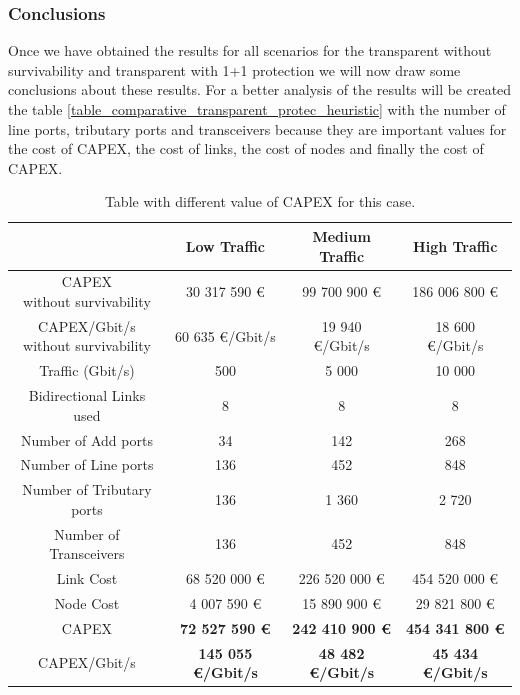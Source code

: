 \vspace{13pt}
\subsubsection{Conclusions}

Once we have obtained the results for all scenarios for the transparent without survivability and transparent with 1+1 protection we will now draw some conclusions about these results. For a better analysis of the results will be created the table \ref{table_comparative_transparent_protec_heuristic} with the number of line ports, tributary ports and transceivers because they are important values for the cost of CAPEX, the cost of links, the cost of nodes and finally the cost of CAPEX.\\

\begin{table}[H]
\centering
\begin{tabular}{| c | c | c | c |}
 \hline
 & Low Traffic & Medium Traffic & High Traffic \\
 \hline\hline
 \makecell{CAPEX \\ without survivability} & 30 317 590 \euro & 99 700 900 \euro & 186 006 800 \euro \\ \hline
 \makecell{CAPEX/Gbit/s \\ without survivability} & 60 635 \euro/Gbit/s & 19 940 \euro/Gbit/s & 18 600 \euro/Gbit/s \\ \hline
 Traffic (Gbit/s) & 500 & 5 000 & 10 000 \\ \hline
 Bidirectional Links used & 8 & 8 & 8 \\ \hline
 Number of Add ports & 34 & 142 & 268 \\ \hline
 Number of Line ports & 136 & 452 & 848 \\ \hline
 Number of Tributary ports & 136 & 1 360 & 2 720 \\ \hline
 Number of Transceivers & 136 & 452 & 848 \\ \hline
 Link Cost & 68 520 000 \euro & 226 520 000 \euro & 454 520 000 \euro \\ \hline
 Node Cost & 4 007 590 \euro & 15 890 900 \euro & 29 821 800 \euro \\ \hline
 CAPEX & \textbf{72 527 590 \euro} & \textbf{242 410 900 \euro} & \textbf{454 341 800 \euro} \\ \hline
 CAPEX/Gbit/s & \textbf{145 055 \euro/Gbit/s} & \textbf{48 482 \euro/Gbit/s} & \textbf{45 434 \euro/Gbit/s} \\ \hline
\end{tabular}
\caption{Table with different value of CAPEX for this case.}
\label{table_comparative_transp_protec_heuristic}
\end{table}

